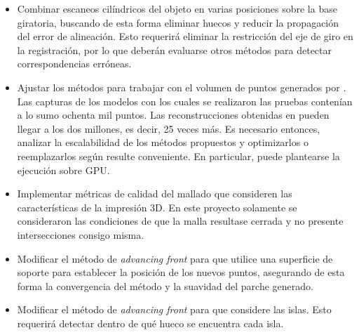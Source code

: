 \begin{itemize}
	\item Combinar escaneos cilíndricos del objeto en varias posiciones sobre la base giratoria,
		buscando de esta forma eliminar huecos y reducir la propagación del error de alineación.
		Esto requerirá eliminar la restricción del eje de giro en la
		registración, por lo que deberán evaluarse otros métodos para detectar
		correspondencias erróneas.
	\item Ajustar los métodos para trabajar con el volumen de puntos generados
		por \cite{Pancho}.  Las capturas de los modelos con los cuales se
		realizaron las pruebas contenían a lo sumo ochenta mil puntos. Las
		reconstrucciones obtenidas en \cite{Pancho} pueden llegar a los
		dos millones, es decir, 25 veces más.
		Es necesario entonces, analizar la escalabilidad de los métodos
		propuestos y optimizarlos o reemplazarlos según resulte conveniente.
		En particular, puede plantearse la ejecución sobre GPU.
	\item Implementar métricas de calidad del mallado que consideren las
		características de la impresión 3D.
		En este proyecto solamente se consideraron las condiciones de que la malla
		resultase cerrada y no presente intersecciones consigo misma.
	\item Modificar el método de \emph{advancing front} para que utilice una
		superficie de soporte para establecer la posición de los nuevos puntos,
		asegurando de esta forma la convergencia del método y la suavidad del
		parche generado.
	\item Modificar el método de \emph{advancing front} para que considere las islas.
		Esto requerirá detectar dentro de qué hueco se encuentra cada isla.
\end{itemize}
